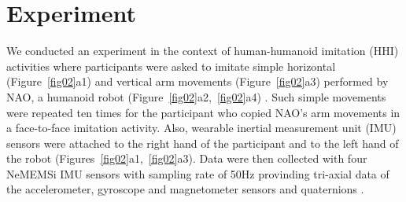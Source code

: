 \documentclass[fleqn,10pt]{wlscirep}
\begin{document}
\section*{Experiment} \label{sec:experiment}
We conducted an experiment in the context of human-humanoid imitation (HHI) activities where participants were asked to imitate simple horizontal (Figure~\ref{fig02}a1) and vertical arm movements (Figure~\ref{fig02}a3) performed by NAO, a humanoid robot (Figure~\ref{fig02}a2,~\ref{fig02}a4) \cite{gouaillier2009}.
Such simple movements were repeated ten times for the participant who copied NAO's arm movements in a face-to-face imitation activity.
Also, wearable inertial measurement unit (IMU) sensors were attached to the right hand of the participant and to the left hand of the robot (Figures~\ref{fig02}a1,~\ref{fig02}a3).
Data were then collected with four NeMEMSi IMU sensors with sampling rate of 50Hz provinding tri-axial data of the accelerometer, gyroscope and magnetometer sensors and quaternions \cite{Comotti2014}.
\end{document}
